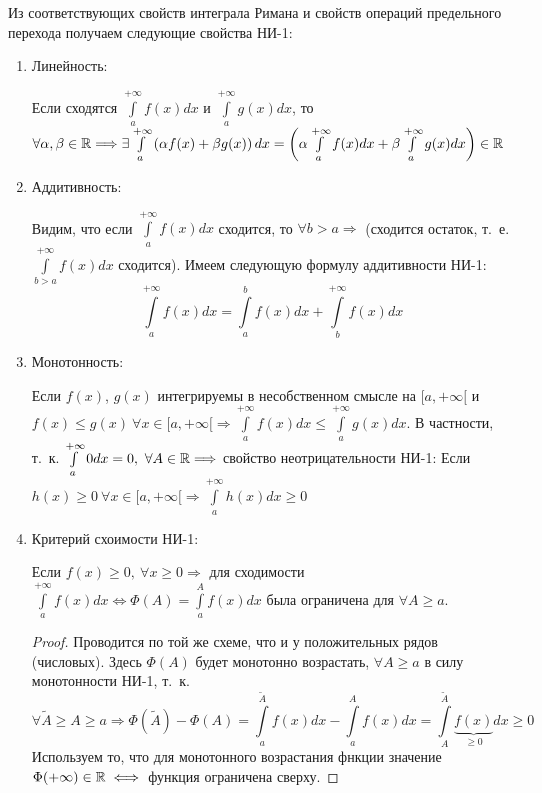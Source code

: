 \documentclass[../../main.tex]{subfiles}
\begin{document}
Из соответствующих свойств интеграла Римана и свойств операций предельного
перехода получаем следующие свойства НИ-1:
\begin{enumerate}
        \item Линейность:
        
        Если сходятся $\int\limits_a^{+\infty} f(x)dx$ и
        $\int\limits_a^{+\infty} g(x)dx$, то $\forall \alpha, \beta \in \mathbb{R}
        \Longrightarrow \\ \exists \int\limits_a^{+\infty} \left( \alpha f(x)
        + \beta g(x) \right)dx = \left( \alpha \int\limits_a^{+\infty}
        f(x)dx + \beta \int\limits_a^{+\infty} g(x)dx \right) \in \mathbb{R} $
        \item Аддитивность:
        
        Видим, что если $\int\limits_a^{+\infty} f(x)dx$ сходится, то
        $\forall b>a \Longrightarrow$ (сходится остаток, т.~е.
        $\int\limits_{b>a}^{+\infty} f(x)dx$ сходится). Имеем следующую формулу
        аддитивности НИ-1:
        \[\int\limits_a^{+\infty} f(x)dx = \int\limits_a^b f(x)dx +
        \int\limits_b^{+\infty} f(x)dx \]
        \item Монотонность:
        
        Если $f(x)$, $g(x)$ интегрируемы в несобственном смысле на $[a, +\infty[$
        и $f(x) \leq g(x) \ \forall x \in [a, +\infty[ \Longrightarrow
        \int\limits_a^{+\infty} f(x)dx \leq \int\limits_a^{+\infty} g(x)dx $.
        В частности, т.~к. $\int\limits_a^{+\infty} 0dx = 0, \ \forall A \in \mathbb{R}
        \Longrightarrow$ свойство неотрицательности НИ-1: Если $h(x) \geq 0 \
        \forall x \in
        [a, +\infty[ \Longrightarrow \int\limits_a^{+\infty} h(x)dx \geq 0$
        \item Критерий схоимости НИ-1:
        
        Если $f(x) \geq 0, \ \forall x \geq 0 \Longrightarrow$ для сходимости
        $ \int\limits_a^{+\infty} f(x)dx \Longleftrightarrow \Phi(A) =
        \int\limits_a^{A} f(x)dx$ была ограничена для $\forall A \geq a$.
        \begin{proof}
            Проводится по той же схеме, что и у положительных рядов (числовых).
            Здесь $\Phi(A)$ будет монотонно возрастать, $\forall A \geq a$
            в силу монотонности НИ-1, т.~к.
            \[\forall \tilde{A} \geq A \geq a
            \Longrightarrow \Phi(\tilde{A}) - \Phi(A) =
            \int\limits_a^{\tilde{A}} f(x)dx - \int\limits_a^{A} f(x)dx =
            \int\limits_A^{\tilde{A}} \underbrace{f(x)}_{\geq 0} dx \geq 0 \]
            Используем то, что для монотонного возрастания фнкции значение
            $\Phi (+\infty) \in \mathbb{R} \iff$ функция ограничена сверху.
        \end{proof}
\end{enumerate}
\end{document}
